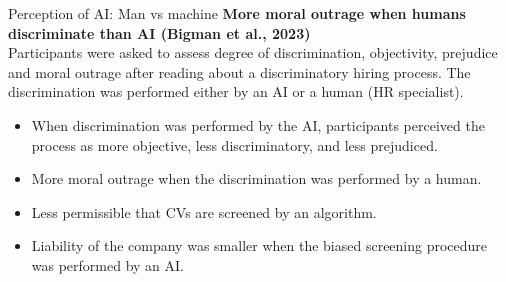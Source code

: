 \documentclass[8pt]{beamer}
\begin{document}
	\begin{frame}[t]{Perception of AI: Man vs machine}
		\textbf{More moral outrage when humans discriminate than AI (Bigman et al., 2023)}\\
		Participants were asked to assess degree of discrimination, objectivity, prejudice and moral outrage after reading about a discriminatory hiring process. The discrimination was performed either by an AI or a human (HR specialist).
		\begin{itemize}
			\item When discrimination was performed by the AI, participants perceived the process as more objective, less discriminatory, and less prejudiced.
			\item <2> More moral outrage when the discrimination was performed by a human.
			\item <2> Less permissible that CVs are screened by an algorithm.
			\item <2> Liability of the company was smaller when the biased screening procedure was performed by an AI.
		\end{itemize}
	\end{frame}
\end{document}
